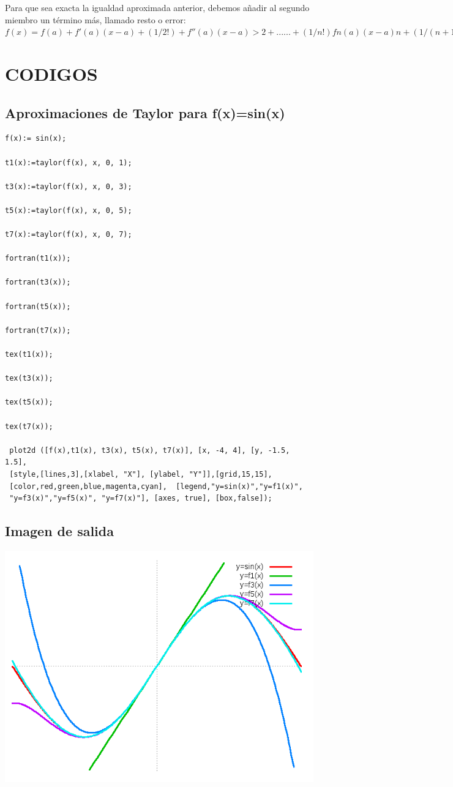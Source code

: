 \documentclass[letterpaper,10pt,twoside,onecolumn]{article}
\begin{document}
Para que sea exacta la igualdad aproximada anterior, debemos añadir al segundo miembro un término más, llamado resto o error:
$f(x) = f(a)+f'(a)(x-a)+(1/2!)+ f''(a)(x-a)>2+ ...... +(1/n!)fn(a)(x-a)n+(1/(n+1)!)+f(n+1)(c)(x-a)(n+1)$

\section{CODIGOS} 
\subsection{Aproximaciones de Taylor para f(x)=sin(x)}
\begin{verbatim}
f(x):= sin(x);

t1(x):=taylor(f(x), x, 0, 1);

t3(x):=taylor(f(x), x, 0, 3);

t5(x):=taylor(f(x), x, 0, 5);

t7(x):=taylor(f(x), x, 0, 7);

fortran(t1(x));

fortran(t3(x));

fortran(t5(x));

fortran(t7(x));

tex(t1(x));

tex(t3(x));

tex(t5(x));

tex(t7(x));

 plot2d ([f(x),t1(x), t3(x), t5(x), t7(x)], [x, -4, 4], [y, -1.5, 1.5],
 [style,[lines,3],[xlabel, "X"], [ylabel, "Y"]],[grid,15,15], 
 [color,red,green,blue,magenta,cyan],  [legend,"y=sin(x)","y=f1(x)",
 "y=f3(x)","y=f5(x)", "y=f7(x)"], [axes, true], [box,false]);

\end{verbatim}

\subsection{Imagen de salida}
\includegraphics[scale=.55]{Taylor.png}
\end{document}

